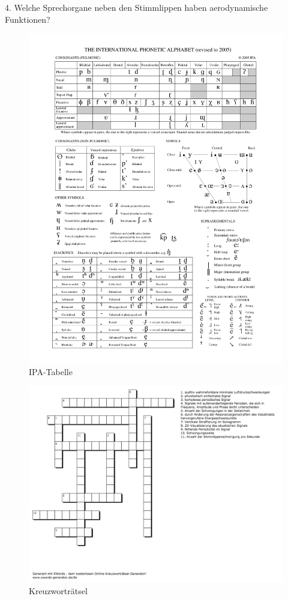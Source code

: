 \documentclass[11pt]{book}
\begin{document}
4.	Welche Sprechorgane neben den Stimmlippen haben aerodynamische Funktionen?
\begin{figure}[htbp]
\begin{center}
\includegraphics[width=\textwidth]{grafiken/sprechen/ipa}
\caption{IPA-Tabelle}
\label{fig4}
\end{center}
\end{figure}

\newpage
\begin{figure}[htbp]
\begin{center}
\includegraphics[width=1.2\textwidth]{grafiken/sprechen/kreuzwortraetsel}
\caption{Kreuzworträtsel}
\label{fig5}
\end{center}
\end{figure}
\end{document}
